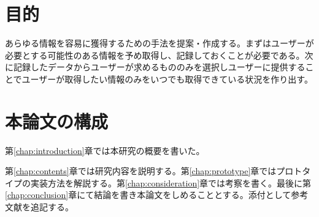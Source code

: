 \section{目的}
あらゆる情報を容易に獲得するための手法を提案・作成する。まずはユーザーが必要とする可能性のある情報を予め取得し、記録しておくことが必要である。次に記録したデータからユーザーが求めるもののみを選択しユーザーに提供することでユーザーが取得したい情報のみをいつでも取得できている状況を作り出す。

\section{本論文の構成}
第\ref{chap:introduction}章では本研究の概要を書いた。

第\ref{chap:contents}章では研究内容を説明する。第\ref{chap:prototype}章ではプロトタイプの実装方法を解説する。第\ref{chap:consideration}章では考察を書く。最後に第\ref{chap:conclusion}章にて結論を書き本論文をしめることとする。添付として参考文献を追記する。
